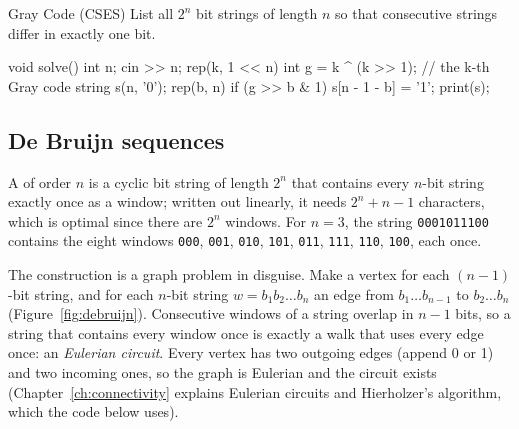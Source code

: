 \begin{problem}{Gray Code (CSES)}
List all $2^n$ bit strings of length $n$ so that consecutive strings differ in exactly one bit.
\end{problem}

\begin{code}
void solve() {
    int n;
    cin >> n;
    rep(k, 1 << n) {
        int g = k ^ (k >> 1);  // the k-th Gray code
        string s(n, '0');
        rep(b, n) if (g >> b & 1) s[n - 1 - b] = '1';
        print(s);
    }
}
\end{code}


\subsection{De Bruijn sequences}

A  of order $n$ is a cyclic bit string of length $2^n$ that contains every $n$-bit string exactly
once as a window; written out linearly, it needs $2^n + n - 1$ characters, which is optimal since there are $2^n$ windows.
For $n = 3$, the string \texttt{0001011100} contains the eight windows \texttt{000}, \texttt{001}, \texttt{010},
\texttt{101}, \texttt{011}, \texttt{111}, \texttt{110}, \texttt{100}, each once.

The construction is a graph problem in disguise. Make a vertex for each $(n-1)$-bit string, and for each $n$-bit string
$w = b_1 b_2 \ldots b_n$ an edge from $b_1 \ldots b_{n-1}$ to $b_2 \ldots b_n$ (Figure~\ref{fig:debruijn}). Consecutive windows
of a string overlap in $n - 1$ bits, so a string that contains every window once is exactly a walk that uses every edge once:
an \emph{Eulerian circuit}. Every vertex has two outgoing edges (append 0 or 1) and two incoming ones, so the graph is Eulerian
and the circuit exists (Chapter~\ref{ch:connectivity} explains Eulerian circuits and Hierholzer's algorithm, which the code
below uses).

